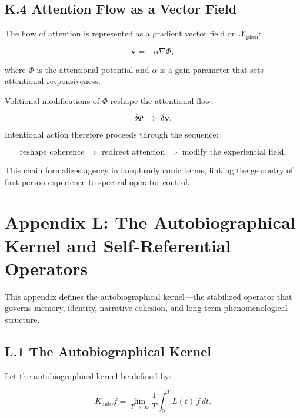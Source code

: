 \documentclass[12pt]{article}
\begin{document}
\subsection*{K.4 Attention Flow as a Vector Field}

The flow of attention is represented as a gradient vector field on
$\mathcal{X}_{\text{phen}}$:

\[
\mathbf{v} = -\alpha \nabla \Phi,
\]

where $\Phi$ is the attentional potential and $\alpha$ is a gain parameter that
sets attentional responsiveness.

Volitional modifications of $\Phi$ reshape the attentional flow:

\[
\delta \Phi \;\Rightarrow\; \delta \mathbf{v}.
\]

Intentional action therefore proceeds through the sequence:

\[
\text{reshape coherence}
\;\Longrightarrow\;
\text{redirect attention}
\;\Longrightarrow\;
\text{modify the experiential field}.
\]

This chain formalizes agency in lamphrodynamic terms, linking the geometry of
first-person experience to spectral operator control.


\section*{Appendix L: The Autobiographical Kernel and Self-Referential Operators}

This appendix defines the autobiographical kernel—the stabilized operator that
governs memory, identity, narrative cohesion, and long-term phenomenological
structure.

\subsection*{L.1 The Autobiographical Kernel}

Let the autobiographical kernel be defined by:

\[
K_{\text{auto}} f
=
\lim_{T\to\infty}
\frac{1}{T}
\int_0^T L(t)\, f \, dt.
\]
\end{document}
